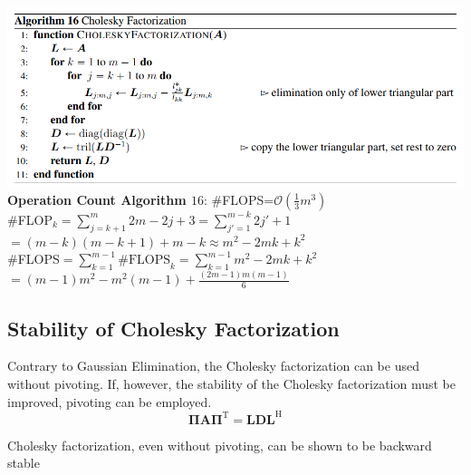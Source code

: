 \documentclass[english]{latex4ei/latex4ei_sheet}
\begin{document}
\begin{sectionbox}
    \includegraphics[width=\textwidth]{img/algo16_cholesky.png}
    \textbf{Operation Count Algorithm $16$}: \#FLOPS=$\mathcal{O}(\frac{1}{3}m^3)$\\
    \#FLOP$_k = \sum_{j=k+1}^{m} 2m-2j+3 = \sum_{j'=1}^{m-k}2j'+1$\\
    $=(m-k)(m-k+1)+m-k\approx m^2-2mk+k^2$\\

    \#FLOPS$=\sum_{k=1}^{m-1}\text{\#FLOPS}_k = \sum_{k=1}^{m-1}m^2-2mk+k^2$\\
    $=(m-1)m^2-m^2(m-1)+\frac{(2m-1)m(m-1)}{6}$
\end{sectionbox}
\begin{sectionbox}
    \subsection{Stability of Cholesky Factorization}
    Contrary to Gaussian Elimination, the Cholesky factorization can be used without pivoting. If, however, the stability of the Cholesky factorization must be improved, pivoting can be employed.
    $$\mathbf{\Pi}\mathbf{A}\mathbf{\Pi}^\text{T} = \mathbf{L}\mathbf{D}\mathbf{L}^\text{H}$$
    \begin{emphbox}
        \large Cholesky factorization, even without pivoting, can be shown to be backward stable
    \end{emphbox}
\end{sectionbox}
\end{document}

